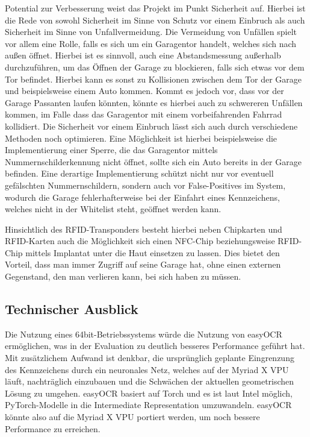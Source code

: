 Potential zur Verbesserung weist das Projekt im Punkt Sicherheit auf. Hierbei ist die Rede von sowohl Sicherheit im Sinne von Schutz vor einem Einbruch als auch Sicherheit im Sinne von Unfallvermeidung. Die Vermeidung von Unfällen spielt vor allem eine Rolle, falls es sich um ein Garagentor handelt, welches sich nach außen öffnet. Hierbei ist es sinnvoll, auch eine Abstandsmessung außerhalb durchzuführen, um das Öffnen der Garage zu blockieren, falls sich etwas vor dem Tor befindet. Hierbei kann es sonst zu Kollisionen zwischen dem Tor der Garage und beispielsweise einem Auto kommen. Kommt es jedoch vor, dass vor der Garage Passanten laufen könnten, könnte es hierbei auch zu schwereren Unfällen kommen, im Falle dass das Garagentor mit einem vorbeifahrenden Fahrrad kollidiert.
Die Sicherheit vor einem Einbruch lässt sich auch durch verschiedene Methoden noch optimieren. Eine Möglichkeit ist hierbei beispielsweise die Implementierung einer Sperre, die das Garagentor mittels Nummernschilderkennung nicht öffnet, sollte sich ein Auto bereits in der Garage befinden. Eine derartige Implementierung schützt nicht nur vor eventuell gefälschten Nummernschildern, sondern auch vor False-Positives im System, wodurch die Garage fehlerhafterweise bei der Einfahrt eines Kennzeichens, welches nicht in der Whitelist steht, geöffnet werden kann. 


Hinsichtlich des RFID-Transponders besteht hierbei neben Chipkarten und RFID-Karten auch die Möglichkeit sich einen NFC-Chip beziehungsweise RFID-Chip mittels Implantat unter die Haut einsetzen zu lassen. Dies bietet den Vorteil, dass man immer Zugriff auf seine Garage hat, ohne einen externen Gegenstand, den man verlieren kann, bei sich haben zu müssen.


\subsection{Technischer Ausblick}
Die Nutzung eines 64bit-Betriebssystems würde die Nutzung von easyOCR ermöglichen, was in der Evaluation zu deutlich besseres Performance geführt hat.
Mit zusätzlichem Aufwand ist denkbar, die ursprünglich geplante Eingrenzung des Kennzeichens durch ein neuronales Netz, welches auf der Myriad X VPU läuft, nachträglich einzubauen und die Schwächen der aktuellen geometrischen Lösung zu umgehen.
easyOCR basiert auf Torch und es ist laut Intel möglich, PyTorch-Modelle in die Intermediate Representation umzuwandeln.
easyOCR könnte also auf die Myriad X VPU portiert werden, um noch bessere Performance zu erreichen.
